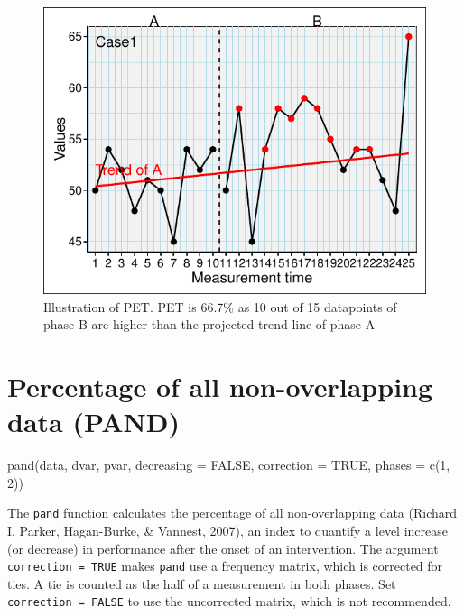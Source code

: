 \documentclass[
  letterpaper,
  DIV=11,
  numbers=noendperiod]{scrreprt}
\begin{document}
\begin{figure}

{\centering \includegraphics{./ch_overlapping_indices_files/figure-pdf/unnamed-chunk-16-1.pdf}

}

\caption{Illustration of PET. PET is 66.7\% as 10 out of 15 datapoints
of phase B are higher than the projected trend-line of phase A}

\end{figure}

\hypertarget{percentage-of-all-non-overlapping-data-pand}{%
\section{Percentage of all non-overlapping data
(PAND)}\label{percentage-of-all-non-overlapping-data-pand}}

\begin{tcolorbox}[enhanced jigsaw, toprule=.15mm, colframe=quarto-callout-tip-color-frame, left=2mm, colback=white, breakable, bottomrule=.15mm, arc=.35mm, rightrule=.15mm, leftrule=.75mm, opacityback=0]
\begin{minipage}[t]{5.5mm}
\textcolor{quarto-callout-tip-color}{\faLightbulb}
\end{minipage}%
\begin{minipage}[t]{\textwidth - 5.5mm}
pand(data, dvar, pvar, decreasing = FALSE, correction = TRUE, phases =
c(1, 2))\end{minipage}%
\end{tcolorbox}

The \texttt{pand} function calculates the percentage of all
non-overlapping data (Richard I. Parker, Hagan-Burke, \& Vannest, 2007),
an index to quantify a level increase (or decrease) in performance after
the onset of an intervention. The argument \texttt{correction\ =\ TRUE}
makes \texttt{pand} use a frequency matrix, which is corrected for ties.
A tie is counted as the half of a measurement in both phases. Set
\texttt{correction\ =\ FALSE} to use the uncorrected matrix, which is
not recommended.
\end{document}
